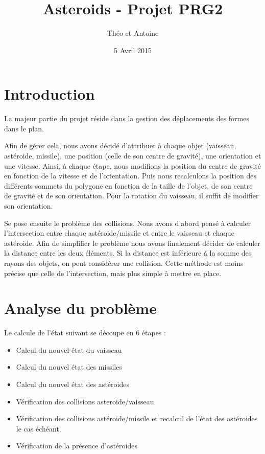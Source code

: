 \documentclass[a4paper,10pt,openany,oneside]{report}
\title{Asteroids - Projet PRG2}
\author{Théo \bsc{Nazé} et Antoine \bsc{Pinsard}}
\date{5 Avril 2015}
\begin{document}
\maketitle

\section{Introduction}

La majeur partie du projet réside dans la gestion des déplacements des formes
dans le plan.

Afin de gérer cela, nous avons décidé d'attribuer à chaque objet (vaisseau,
astéroide, missile), une position (celle de son centre de gravité), une
orientation et une vitesse. Ainsi, à chaque étape, nous modifions la position
du centre de gravité en fonction de la vitesse et de l'orientation. Puis nous
recalculons la position des différents sommets du polygone en fonction de la
taille de l'objet, de son centre de gravité et de son orientation. Pour la
rotation du vaisseau, il suffit de modifier son orientation.

Se pose ensuite le problème des collisions. Nous avons d'abord pensé à calculer
l'intersection entre chaque astéroide/missile et entre le vaisseau et chaque
astéroide. Afin de simplifier le problème nous avons finalement décider de
calculer la distance entre les deux éléments. Si la distance est inférieure à
la somme des rayons des objets, on peut considérer une collision. Cette méthode
est moins précise que celle de l'intersection, mais plus simple à mettre en
place.

\section{Analyse du problème}

Le calcule de l'état suivant se découpe en 6 étapes :

\begin{itemize}
  \item Calcul du nouvel état du vaisseau
  \item Calcul du nouvel état des missiles
  \item Calcul du nouvel état des astéroides
  \item Vérification des collisions asteroide/vaisseau
  \item Vérification des collisions astéroide/missile et recalcul de l'état des
    astéroides le cas échéant.
  \item Vérification de la présence d'astéroides
\end{itemize}
\end{document}
